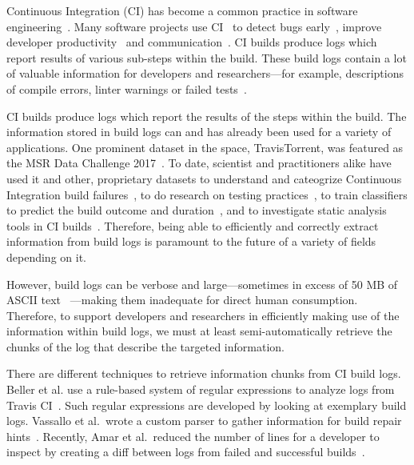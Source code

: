 Continuous Integration (CI) has become a common practice in software
engineering~\cite{hilton2016usage}.  Many software projects use
CI~\cite{hilton2016usage,staahl2014modeling,beller2017oops} to detect
bugs early~\cite{vasilescu2015quality,duvall2007continuous}, improve
developer productivity~\cite{miller2008hundred,hilton2016usage} and
communication~\cite{downs2012ambient}.  CI builds produce logs which
report results of various sub-steps within the build.  These build logs
contain a lot of valuable information for developers and researchers---for
example, descriptions of compile errors, linter warnings or failed
tests~\cite{beller2017oops,seo2014programmers,vassallo2017a-tale}.

CI builds produce logs which report the results of the steps within the build. The information stored in build logs can and has
already been used for a variety of applications. One prominent dataset
in the space, TravisTorrent, was featured as the MSR Data Challenge
2017~\cite{msr17challenge}. To date, scientist and practitioners alike
have used it and other, proprietary datasets to understand and
cateogrize Continuous Integration build
failures~\cite{islam2017insights}, to do research on testing
practices~\cite{orellana2017differences}, to train classifiers to
predict the build outcome and
duration~\cite{ni2017cost,bisong2017built,machalica2019predictive},
and to investigate static analysis tools in CI
builds~\cite{zampetti2017open}. Therefore, being able to efficiently
and correctly extract information from build logs is paramount to the
future of a variety of fields depending on it.

However, build logs can be verbose and large---sometimes in excess of
50 MB of ASCII text ~\cite{beller2017oops}---making them inadequate
for direct human consumption. Therefore, to support developers and
researchers in efficiently making use of the information within build
logs, we must at least semi-automatically retrieve the chunks of the
log that describe the targeted information.

There are different techniques to retrieve information chunks from CI
build logs. Beller et al. use a rule-based system of regular
expressions to analyze logs from Travis CI~\cite{beller2017oops}.
Such regular expressions are developed by looking at exemplary build
logs.  Vassallo et al.\ wrote a custom parser to gather information
for build repair hints~\cite{vassallo2018un-break}.  Recently, Amar et
al.\ reduced the number of lines for a developer to inspect by
creating a diff between logs from failed and successful
builds~\cite{amar2019mining}.

